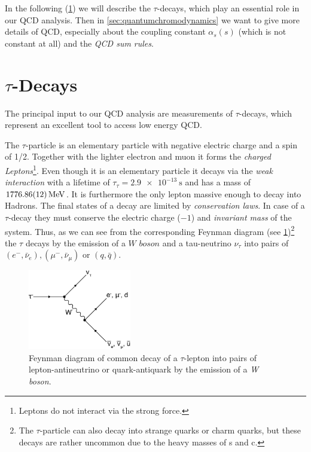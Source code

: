 \documentclass[../../index.tex]{subfiles}
\begin{document}
In the following (\cref{sec:tauDecays}) we will describe the $\tau$-decays, which
play an essential role in our QCD analysis. Then in \cref{sec:quantumchromodynamics} we want to give more
details of QCD, especially about the coupling constant $\alpha_s(s)$ (which is not
constant at all) and the \textit{QCD sum rules}.


\section{$\tau$-Decays}
\label{sec:tauDecays}
The principal input to our QCD analysis are measurements of $\tau$-decays, which
represent an excellent tool to access low energy QCD.

The $\tau$-particle is an elementary particle with negative electric charge and a
spin of 1/2. Together with the lighter electron and muon it forms the
\textit{charged Leptons}\footnote{Leptons do not interact via the strong force.}.
Even though it is an elementary particle it decays via the \textit{weak
  interaction} with a lifetime of $\tau_\tau=\SI{2.9e-13}{\second}$ and has a mass
of $\SI{1776.86\pm0.12}{\mega\electronvolt}$\cite{PDG2018}. It is furthermore the only
lepton massive enough to decay into Hadrons.
The final states of a decay are limited by \textit{conservation laws}. In case
of a $\tau$-decay they must conserve the electric charge ($-1$) and
\textit{invariant mass} of the system. Thus, as we can see from
the corresponding Feynman diagram
(see \cref{fig:tauDecay})\footnote{The $\tau$-particle can also decay into strange
  quarks or charm quarks, but these decays are rather uncommon due to the heavy
  masses of s and c.} the $\tau$ decays by the emission of a $\textit{W boson}$
and a tau-neutrino $\nu_\tau$ into pairs of $(e^-, \bar\nu_e), (\mu^-,
\bar\nu_\mu)$ or $(q, \bar q)$.
\begin{figure}[h]
  \centering
  \includegraphics[width=0.4\textwidth]{images/tauDecay.eps}
  \caption{Feynman diagram of common decay of a $\tau$-lepton into pairs of
    lepton-antineutrino or quark-antiquark by the emission of a \textit{W boson}.}
  \label{fig:tauDecay}
\end{figure}
\end{document}
